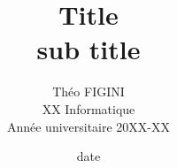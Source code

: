 \documentclass[12pt]{report}
\title{{\huge \bfseries Title}\\[0.2cm]
		{\Large sub title}}
\author{Théo \textsc{FIGINI}\\XX Informatique\\Année universitaire 20XX-XX}
\date{date}
\begin{document}


\renewcommand{\thefigure}{\arabic{figure}}
\setcounter{figure}{0}






\end{document}

